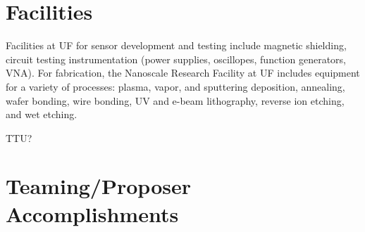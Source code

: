 \section{Facilities}

Facilities at UF for sensor development and testing include magnetic shielding, circuit testing instrumentation (power supplies, oscillopes, function generators, VNA). For fabrication, the Nanoscale Research Facility at UF includes equipment for a variety of processes: plasma, vapor, and sputtering deposition, annealing, wafer bonding, wire bonding, UV and e-beam lithography, reverse ion etching, and wet etching.

TTU?

\section{Teaming/Proposer Accomplishments}

